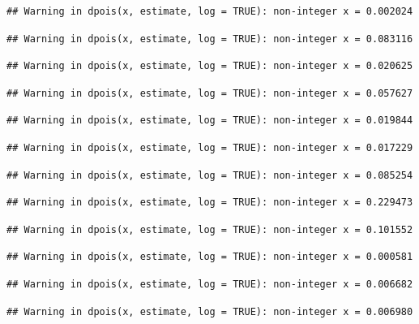 \documentclass[]{article}
\begin{document}
\begin{verbatim}
## Warning in dpois(x, estimate, log = TRUE): non-integer x = 0.002024
\end{verbatim}

\begin{verbatim}
## Warning in dpois(x, estimate, log = TRUE): non-integer x = 0.083116
\end{verbatim}

\begin{verbatim}
## Warning in dpois(x, estimate, log = TRUE): non-integer x = 0.020625
\end{verbatim}

\begin{verbatim}
## Warning in dpois(x, estimate, log = TRUE): non-integer x = 0.057627
\end{verbatim}

\begin{verbatim}
## Warning in dpois(x, estimate, log = TRUE): non-integer x = 0.019844
\end{verbatim}

\begin{verbatim}
## Warning in dpois(x, estimate, log = TRUE): non-integer x = 0.017229
\end{verbatim}

\begin{verbatim}
## Warning in dpois(x, estimate, log = TRUE): non-integer x = 0.085254
\end{verbatim}

\begin{verbatim}
## Warning in dpois(x, estimate, log = TRUE): non-integer x = 0.229473
\end{verbatim}

\begin{verbatim}
## Warning in dpois(x, estimate, log = TRUE): non-integer x = 0.101552
\end{verbatim}

\begin{verbatim}
## Warning in dpois(x, estimate, log = TRUE): non-integer x = 0.000581
\end{verbatim}

\begin{verbatim}
## Warning in dpois(x, estimate, log = TRUE): non-integer x = 0.006682
\end{verbatim}

\begin{verbatim}
## Warning in dpois(x, estimate, log = TRUE): non-integer x = 0.006980
\end{verbatim}
\end{document}

